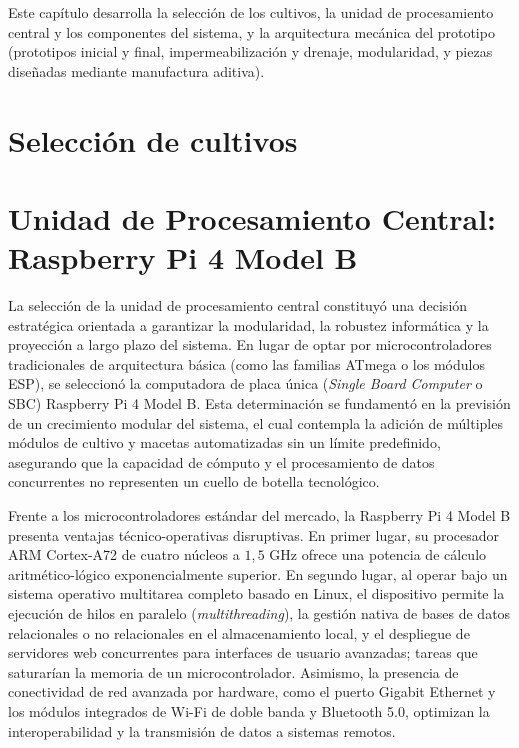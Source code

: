 Este capítulo desarrolla la selección de los cultivos, la unidad de procesamiento central y los componentes del sistema, y la arquitectura mecánica del prototipo (prototipos inicial y final, impermeabilización y drenaje, modularidad, y piezas diseñadas mediante manufactura aditiva).

\section{Selección de cultivos}
\label{sec:seleccion_cultivos}


\section{Unidad de Procesamiento Central: Raspberry Pi 4 Model B}
\label{sec:raspberry_pi}

La selección de la unidad de procesamiento central constituyó una decisión estratégica orientada a garantizar la modularidad, la robustez informática y la proyección a largo plazo del sistema. En lugar de optar por microcontroladores tradicionales de arquitectura básica (como las familias ATmega o los módulos ESP), se seleccionó la computadora de placa única (\textit{Single Board Computer} o SBC) Raspberry Pi 4 Model B. Esta determinación se fundamentó en la previsión de un crecimiento modular del sistema, el cual contempla la adición de múltiples módulos de cultivo y macetas automatizadas sin un límite predefinido, asegurando que la capacidad de cómputo y el procesamiento de datos concurrentes no representen un cuello de botella tecnológico.

Frente a los microcontroladores estándar del mercado, la Raspberry Pi 4 Model B presenta ventajas técnico-operativas disruptivas. En primer lugar, su procesador ARM Cortex-A72 de cuatro núcleos a $1{,}5\text{ GHz}$ ofrece una potencia de cálculo aritmético-lógico exponencialmente superior. En segundo lugar, al operar bajo un sistema operativo multitarea completo basado en Linux, el dispositivo permite la ejecución de hilos en paralelo (\textit{multithreading}), la gestión nativa de bases de datos relacionales o no relacionales en el almacenamiento local, y el despliegue de servidores web concurrentes para interfaces de usuario avanzadas; tareas que saturarían la memoria de un microcontrolador. Asimismo, la presencia de conectividad de red avanzada por hardware, como el puerto Gigabit Ethernet y los módulos integrados de Wi-Fi de doble banda y Bluetooth 5.0, optimizan la interoperabilidad y la transmisión de datos a sistemas remotos.

